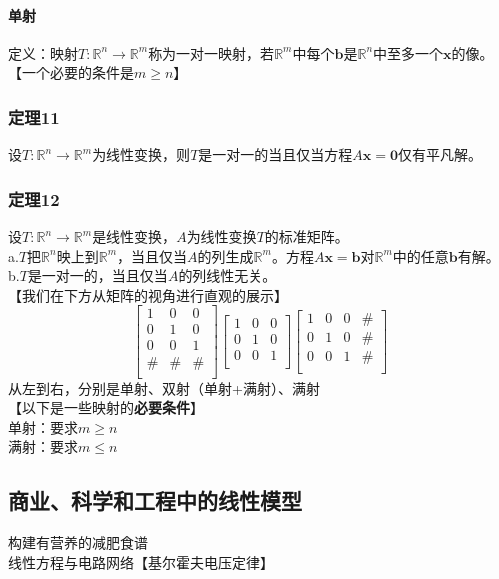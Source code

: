 \documentclass{article}
\newcommand{\ve}{\boldsymbol}
\begin{document}
\begin{CJK}{UTF8}{gkai}
\paragraph{单射\\}
定义：映射$T:\mathbb{R}^n\to\mathbb{R}^m$称为一对一映射，若$\mathbb{R}^m$中每个$\ve{b}$是$\mathbb{R}^n$中至多一个$\ve{x}$的像。\\
【一个必要的条件是$m\geq n$】
\subsubsection{定理11}
设$T:\mathbb{R}^n\to\mathbb{R}^m$为线性变换，则$T$是一对一的当且仅当方程$A\ve{x}=\ve{0}$仅有平凡解。\\
\subsubsection{定理12}
设$T:\mathbb{R}^n\to\mathbb{R}^m$是线性变换，$A$为线性变换$T$的标准矩阵。\\
a.$T$把$\mathbb{R}^n$映上到$\mathbb{R}^m$，当且仅当$A$的列生成$\mathbb{R}^m$。方程$A\ve{x}=\ve{b}$对$\mathbb{R}^m$中的任意$\ve{b}$有解。\\
b.$T$是一对一的，当且仅当$A$的列线性无关。\\
【我们在下方从矩阵的视角进行直观的展示】\\
\[\begin{bmatrix}
1&0&0\\
0&1&0\\
0&0&1\\
\#&\#&\#\\
\end{bmatrix} 
\begin{bmatrix}
1&0&0\\
0&1&0\\
0&0&1\\
\end{bmatrix} 
\begin{bmatrix}
1&0&0&\#\\
0&1&0&\#\\
0&0&1&\#\\

\end{bmatrix} 
   \]
从左到右，分别是单射、双射（单射+满射）、满射\\
【以下是一些映射的\textbf{必要条件}】\\
单射：要求$m\geq n$\\
满射：要求$m\leq n$\\
\subsection{商业、科学和工程中的线性模型}
构建有营养的减肥食谱\\
线性方程与电路网络【基尔霍夫电压定律】\\

\end{CJK}
\end{document}
